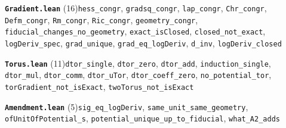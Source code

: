 \documentclass[11pt,a4paper]{article}
\theoremstyle{sudef}
\begin{document}
\noindent\textbf{\texttt{Gradient.lean}} (16)\quad \texttt{hess\_\allowbreak congr}, \texttt{gradsq\_\allowbreak congr}, \texttt{lap\_\allowbreak congr}, \texttt{Chr\_\allowbreak congr}, \texttt{Defm\_\allowbreak congr}, \texttt{Rm\_\allowbreak congr}, \texttt{Ric\_\allowbreak congr}, \texttt{geometry\_\allowbreak congr}, \texttt{fiducial\_\allowbreak changes\_\allowbreak no\_\allowbreak geometry}, \texttt{exact\_\allowbreak isClosed}, \texttt{closed\_\allowbreak not\_\allowbreak exact}, \texttt{logDeriv\_\allowbreak spec}, \texttt{grad\_\allowbreak unique}, \texttt{grad\_\allowbreak eq\_\allowbreak logDeriv}, \texttt{d\_\allowbreak inv}, \texttt{logDeriv\_\allowbreak closed}\par\smallskip
\noindent\textbf{\texttt{Torus.lean}} (11)\quad \texttt{dtor\_\allowbreak single}, \texttt{dtor\_\allowbreak zero}, \texttt{dtor\_\allowbreak add}, \texttt{induction\_\allowbreak single}, \texttt{dtor\_\allowbreak mul}, \texttt{dtor\_\allowbreak comm}, \texttt{dtor\_\allowbreak uTor}, \texttt{dtor\_\allowbreak coeff\_\allowbreak zero}, \texttt{no\_\allowbreak potential\_\allowbreak tor}, \texttt{torGradient\_\allowbreak not\_\allowbreak isExact}, \texttt{twoTorus\_\allowbreak not\_\allowbreak isExact}\par\smallskip
\noindent\textbf{\texttt{Amendment.lean}} (5)\quad \texttt{sig\_\allowbreak eq\_\allowbreak logDeriv}, \texttt{same\_\allowbreak unit\_\allowbreak same\_\allowbreak geometry}, \texttt{ofUnitOfPotential\_\allowbreak s}, \texttt{potential\_\allowbreak unique\_\allowbreak up\_\allowbreak to\_\allowbreak fiducial}, \texttt{what\_\allowbreak A2\_\allowbreak adds}\par\smallskip
\end{document}
